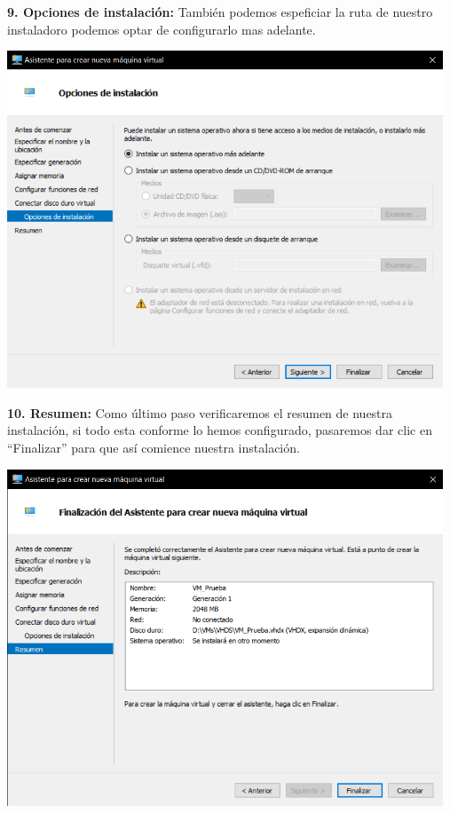\begin{enumerate}
\textbf {9. Opciones de instalación:} También podemos espeficiar la ruta de nuestro instaladoro podemos optar de configurarlo mas adelante.
\begin{center}
  \includegraphics[width=13cm]{Imagenes/Opciones_Instalacion.png}
\end{center}
\break

\textbf {10. Resumen:} Como último paso verificaremos el resumen de nuestra instalación, si todo esta conforme lo hemos configurado, pasaremos dar clic en “Finalizar” para que así comience nuestra instalación.
\begin{center}
  \includegraphics[width=13cm]{Imagenes/Resumen.png}
\end{center}
\break


\end{enumerate}
